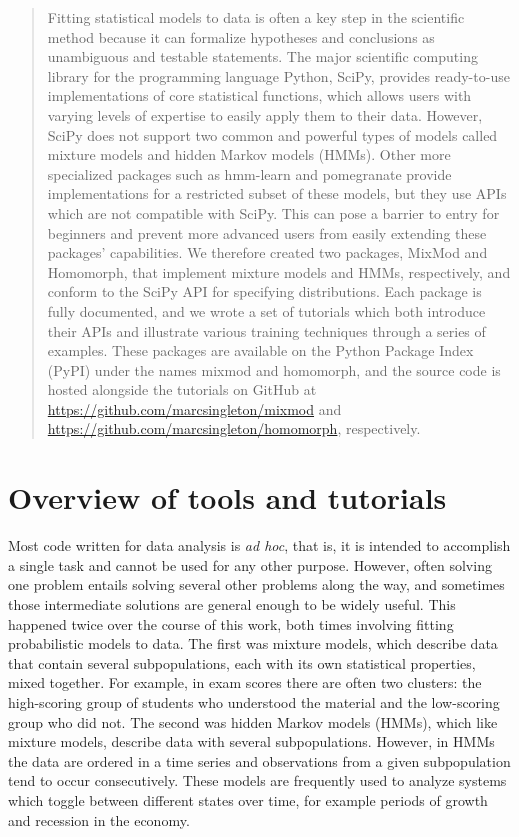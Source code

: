 \begin{abstract}
\noindent
Fitting statistical models to data is often a key step in the scientific method because it can formalize hypotheses and conclusions as unambiguous and testable statements. The major scientific computing library for the programming language Python, SciPy, provides ready-to-use implementations of core statistical functions, which allows users with varying levels of expertise to easily apply them to their data. However, SciPy does not support two common and powerful types of models called mixture models and hidden Markov models (HMMs). Other more specialized packages such as hmm-learn and pomegranate provide implementations for a restricted subset of these models, but they use APIs which are not compatible with SciPy. This can pose a barrier to entry for beginners and prevent more advanced users from easily extending these packages' capabilities. We therefore created two packages, MixMod and Homomorph, that implement mixture models and HMMs, respectively, and conform to the SciPy API for specifying distributions. Each package is fully documented, and we wrote a set of tutorials which both introduce their APIs and illustrate various training techniques through a series of examples. These packages are available on the Python Package Index (PyPI) under the names mixmod and homomorph, and the source code is hosted alongside the tutorials on GitHub at \url{https://github.com/marcsingleton/mixmod} and \url{https://github.com/marcsingleton/homomorph}, respectively.
\end{abstract}

\section{Overview of tools and tutorials}
Most code written for data analysis is \textit{ad hoc}, that is, it is intended to accomplish a single task and cannot be used for any other purpose. However, often solving one problem entails solving several other problems along the way, and sometimes those intermediate solutions are general enough to be widely useful. This happened twice over the course of this work, both times involving fitting probabilistic models to data. The first was mixture models, which describe data that contain several subpopulations, each with its own statistical properties, mixed together. For example, in exam scores there are often two clusters: the high-scoring group of students who understood the material and the low-scoring group who did not. The second was hidden Markov models (HMMs), which like mixture models, describe data with several subpopulations. However, in HMMs the data are ordered in a time series and observations from a given subpopulation tend to occur consecutively. These models are frequently used to analyze systems which toggle between different states over time, for example periods of growth and recession in the economy.

